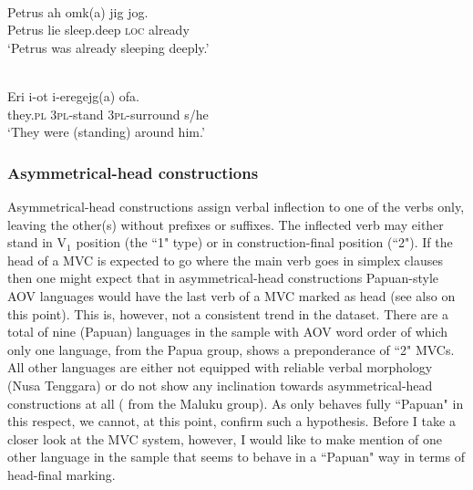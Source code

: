 \ea 
{}\\
\gll Petrus ah omk(a) jig jog. \\
Petrus lie sleep.deep \textsc{loc} already \\
\glft `Petrus was already sleeping deeply.’ \\ 
\z

\ea 
{}\\
\gll Eri i-ot i-eregejg(a) ofa. \\
they.\textsc{pl} 3\textsc{pl}-stand 3\textsc{pl}-surround s/he \\
\glft `They were (standing) around him.’\\ 
\z

\subsubsection{Asymmetrical-head constructions} \label{sec:asymmetrical}

Asymmetrical-head constructions assign verbal inflection to one of the verbs only, leaving the other(s) without prefixes or suffixes. The inflected verb may either stand in V$_1$ position (the ``1" type) or in construction-final position (``2"). If the head of a MVC is expected to go where the main verb goes in simplex clauses then one might expect that in asymmetrical-head constructions Papuan-style AOV languages would have the last verb of a MVC marked as head (see also \citealt{Durie1997} on this point). This is, however, not a consistent trend in the dataset. There are a total of nine (Papuan) languages in the sample with AOV word order of which only one language,  from the Papua group, shows a preponderance of ``2" MVCs. All other languages are either not equipped with reliable verbal morphology (Nusa Tenggara) or do not show any inclination towards asymmetrical-head constructions at all ( from the Maluku group). As only  behaves fully ``Papuan" in this respect, we cannot, at this point, confirm such a hypothesis. Before I take a closer look at the  MVC system, however, I would like to make mention of one other language in the sample that seems to behave in a ``Papuan" way in terms of head-final marking.


